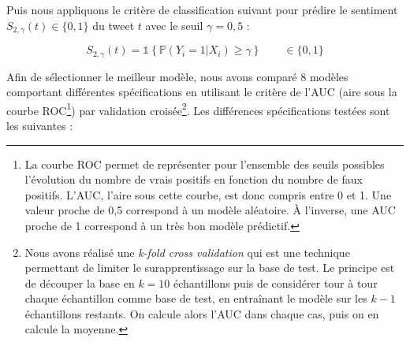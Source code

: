 \documentclass[11pt,french,french]{article}
\let\rmarkdownfootnote\footnote%
\def\footnote{\protect\rmarkdownfootnote}
\begin{document}
Puis nous appliquons le critère de classification suivant pour prédire
le sentiment \(S_{2,\gamma}(t) \in \{0,1\}\) du tweet \(t\) avec le
seuil \(\gamma = 0,5\) :

\[S_{2,\gamma}(t) = \mathds{1}\left\{   \mathbb{P}(Y_i = 1 | X_{i}) \ge \gamma\right\} \qquad \in \{0,1\}\]

Afin de sélectionner le meilleur modèle, nous avons comparé 8 modèles
comportant différentes spécifications en utilisant le critère de l'AUC
(aire sous la courbe ROC\footnote{La courbe ROC permet de représenter
  pour l'ensemble des seuils possibles l'évolution du nombre de vrais
  positifs en fonction du nombre de faux positifs. L'AUC, l'aire sous
  cette courbe, est donc compris entre 0 et 1. Une valeur proche de 0,5
  correspond à un modèle aléatoire. À l'inverse, une AUC proche de 1
  correspond à un très bon modèle prédictif.}) par validation
croisée\footnote{Nous avons réalisé une \emph{k-fold cross validation}
  qui est une technique permettant de limiter le surapprentissage sur la
  base de test. Le principe est de découper la base en \(k = 10\)
  échantillons puis de considérer tour à tour chaque échantillon comme
  base de test, en entraînant le modèle sur les \(k-1\) échantillons
  restants. On calcule alors l'AUC dans chaque cas, puis on en calcule
  la moyenne.}. Les différences spécifications testées sont les
suivantes :
\end{document}
